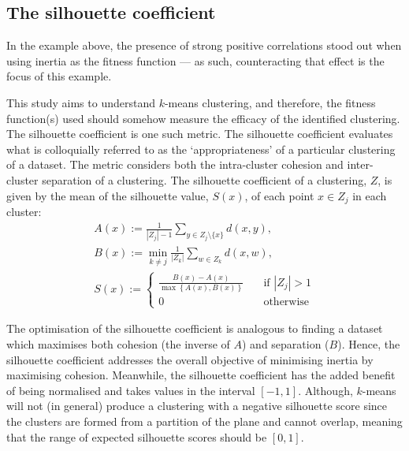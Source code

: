 \subsection{The silhouette coefficient}\label{subsec:silhouette}

In the example above, the presence of strong positive correlations stood out
when using inertia as the fitness function --- as such, counteracting that
effect is the focus of this example.

This study aims to understand \(k\)-means clustering, and therefore, the fitness
function(s) used should somehow measure the efficacy of the identified
clustering. The silhouette coefficient is one such metric. The silhouette
coefficient evaluates what is colloquially referred to as the `appropriateness'
of a particular clustering of a dataset. The metric considers both the
intra-cluster cohesion and inter-cluster separation of a clustering. The
silhouette coefficient of a clustering, \(Z\), is given by the mean of the
silhouette value, \(S(x)\), of each point \(x \in Z_j\) in each cluster:
\begin{equation}
    \begin{gathered}
        A(x) := \frac{1}{|Z_j| - 1} \sum_{y \in Z_j \setminus \{x\}} d(x, y),
        \\
        B(x) := \min_{k \neq j} \frac{1}{|Z_k|} \sum_{w \in Z_k} d(x, w),
        \\
        S(x) :=
            \begin{cases}
                \frac{B(x) - A(x)}{\max\left\{A(x), B(x)\right\}}
                &\quad \text{if } |Z_j| > 1\\
                0 &\quad \text{otherwise}
            \end{cases}
    \end{gathered}\label{eq:silhouette}
\end{equation}

The optimisation of the silhouette coefficient is analogous to finding a dataset
which maximises both cohesion (the inverse of \(A\)) and separation (\(B\)).
Hence, the silhouette coefficient addresses the overall objective of minimising
inertia by maximising cohesion. Meanwhile, the silhouette coefficient has the
added benefit of being normalised and takes values in the interval \(\left[-1,
1\right]\). Although, \(k\)-means will not (in general) produce a clustering
with a negative silhouette score since the clusters are formed from a partition
of the plane and cannot overlap, meaning that the range of expected silhouette
scores should be \(\left[0, 1\right]\).

